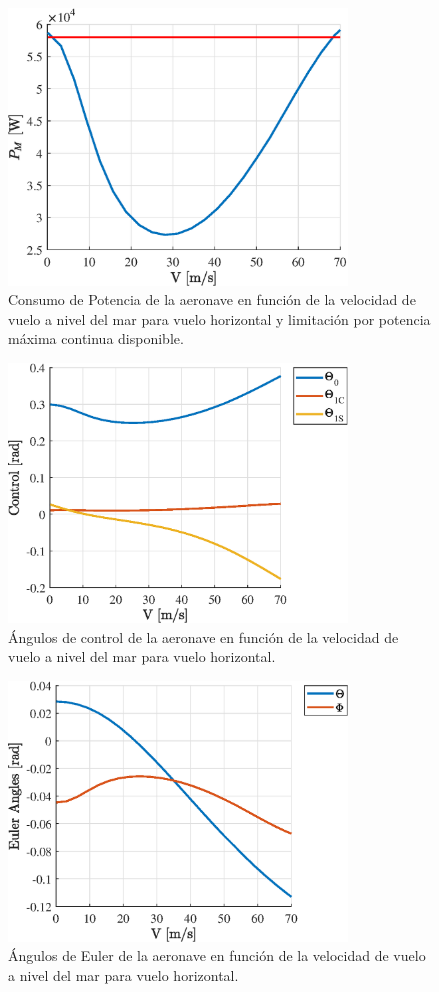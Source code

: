 \begin{figure}
	\centering
	\includegraphics[width=90mm]{graficos/PMVH}
	\caption{Consumo de Potencia de la aeronave en función de la velocidad de vuelo a nivel del mar para vuelo horizontal y limitación por potencia máxima continua disponible.}
	\label{PMVH}
\end{figure}
\begin{figure}
	\centering
	\includegraphics[width=90mm]{graficos/ControlVH}
	\caption{Ángulos de control de la aeronave en función de la velocidad de vuelo a nivel del mar para vuelo horizontal.}
	\label{ControlVH}
\end{figure}
\begin{figure}
	\centering
	\includegraphics[width=90mm]{graficos/EulerVH}
	\caption{Ángulos de Euler de la aeronave en función de la velocidad de vuelo a nivel del mar para vuelo horizontal.}
	\label{EulerVH}
\end{figure}
